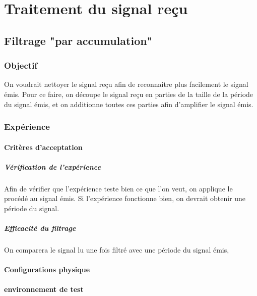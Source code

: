 	
	

\part{Traitement du signal reçu}


\chapter{Filtrage "par accumulation"}\label{waveform_averaging}
\section{Objectif}
On voudrait nettoyer le signal reçu afin de reconnaitre plus facilement le signal émis.
Pour ce faire, on découpe le signal reçu en parties de la taille de la période du signal émis, et on additionne toutes ces parties afin d'amplifier le signal émis. 

\section{Expérience}
\subsection{Critères d'acceptation}
\subsubsection{Vérification de l'expérience}
Afin de vérifier que l'expérience teste bien ce que l'on veut, on applique le procédé au signal émis. Si l'expérience fonctionne bien, on devrait obtenir une période du signal.
\subsubsection{Efficacité du filtrage}
On comparera le signal lu une fois filtré avec une période du signal émis, 

\subsection{Configurations physique}

\subsection{environnement de test}

